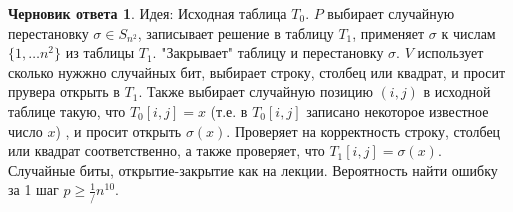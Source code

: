 \documentclass[a4paper]{article}
\theoremstyle{plain}
\theoremstyle{definition}
\newtheorem*{draft}{Черновик ответа}
\begin{document}
\begin{draft}
Идея: Исходная таблица $T_0$. $P$ выбирает случайную перестановку $\sigma \in S_{n^2}$, записывает решение в таблицу $T_1$, применяет $\sigma$ к числам $\{1,\ldots n^2\}$ из таблицы $T_1$. "Закрывает" таблицу и перестановку $\sigma$. $V$ использует сколько нужжно случайных бит, выбирает строку, столбец или квадрат, и просит прувера открыть в $T_1$. Также выбирает случайную позицию $(i,j)$ в исходной таблице такую, что $T_0[i,j] = x$ (т.е. в $T_0[i,j]$ записано некоторое известное число $x$) , и просит открыть $\sigma (x)$. Проверяет на корректность строку, столбец или квадрат соответственно, а также проверяет, что $T_1[i,j] = \sigma(x)$. Случайные биты, открытие-закрытие как на лекции. Вероятность найти ошибку за 1 шаг $p \geq \frac{1}/n^10$.  
\end{draft}
\end{document}
